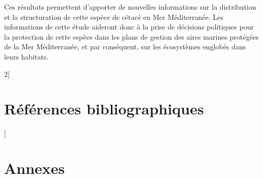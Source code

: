\documentclass[a4paper,12pt,twoside]{article}\usepackage[]{graphicx}\usepackage[]{color}
\begin{document}
Ces résultats permettent d'apporter de nouvelles informations sur la distribution et la structuration de cette espèce de cétacé en Mer Méditerranée. Les informations de cette étude aideront donc à la prise de décisions politiques pour la protection de cette espèce dans les plans de gestion des aires marines protégées de la Mer Méditerranée, et par conséquent, sur les écosystèmes englobés dans leurs habitats.


\FloatBarrier
\newpage
\begin{otherlanguage}{english}
	\singlespacing
	\begin{multicols}{2}[\section*{Références bibliographiques}]
		\begingroup
		\def\section*#1{}
		\small
		
		
		\endgroup
	\end{multicols}
\end{otherlanguage}

\newpage
\listoffigures  %
\listoftables   %

\newpage
\section{Annexes}
\end{document}
